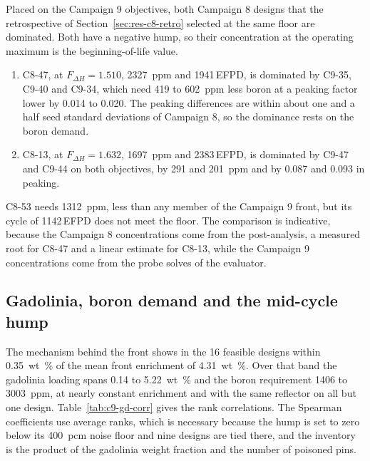 Placed on the Campaign 9 objectives, both Campaign 8 designs that the
retrospective of Section~\ref{sec:res-c8-retro} selected at the same floor
are dominated. Both have a negative hump, so their concentration at the
operating maximum is the beginning-of-life value.

\begin{enumerate}
  \item C8-47, at $F_{\Delta H} = 1.510$, \SI{2327}{ppm} and 1941\,EFPD, is
        dominated by C9-35, C9-40 and C9-34, which need 419 to
        \SI{602}{ppm} less boron at a peaking factor lower by 0.014 to
        0.020. The peaking differences are within about one and a half seed
        standard deviations of Campaign 8, so the dominance rests on the
        boron demand.

  \item C8-13, at $F_{\Delta H} = 1.632$, \SI{1697}{ppm} and 2383\,EFPD, is
        dominated by C9-47 and C9-44 on both objectives, by 291 and
        \SI{201}{ppm} and by 0.087 and 0.093 in peaking.
\end{enumerate}

C8-53 needs \SI{1312}{ppm}, less than any member of the Campaign 9 front,
but its cycle of 1142\,EFPD does not meet the floor. The comparison is
indicative, because the Campaign 8 concentrations come from the
post-analysis, a measured root for C8-47 and a linear estimate for C8-13,
while the Campaign 9 concentrations come from the probe solves of the
evaluator.

\subsection{Gadolinia, boron demand and the mid-cycle hump}
\label{sec:res-c9-gd}

The mechanism behind the front shows in the 16 feasible designs within
\SI{0.35}{wt\%} of the mean front enrichment of \SI{4.31}{wt\%}. Over that
band the gadolinia loading spans 0.14 to \SI{5.22}{wt\%} and the boron
requirement 1406 to \SI{3003}{ppm}, at nearly constant enrichment and with
the same reflector on all but one design. Table~\ref{tab:c9-gd-corr} gives
the rank correlations. The Spearman coefficients use average ranks, which
is necessary because the hump is set to zero below its \SI{400}{pcm} noise
floor and nine designs are tied there, and the inventory is the product of
the gadolinia weight fraction and the number of poisoned pins.

